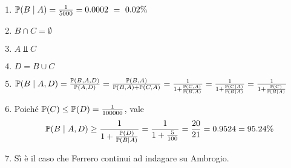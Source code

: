 \Soluzione

\Soluzione

\Soluzione

\Soluzione

\begin{enumerate}
	\item $\mathbb{P}( B\mid A) =\frac{1}{5000} =0.0002\ =\ 0.02\%$
	\item $B\cap C=\emptyset $
	\item $A\Bot C$
	\item $D=B\cup C$
	\item $\mathbb{P}( B\mid A,D) =\frac{\mathbb{P}( B,A,D)}{\mathbb{P}( A,D)} =\frac{\mathbb{P}( B,A)}{\mathbb{P}( B,A) +\mathbb{P}( C,A)} =\frac{1}{1+\frac{\mathbb{P}( C,A)}{\mathbb{P}( B,A)}} =\frac{1}{1+\frac{\mathbb{P}( C\mid A)}{\mathbb{P}( B\mid A)}} =\frac{1}{1+\frac{\mathbb{P}( C)}{\mathbb{P}( B\mid A)}}$
	\item Poiché $\mathbb{P}( C) \leq \mathbb{P}( D) =\frac{1}{100000}$, vale
	\begin{equation*}
		\mathbb{P}( B\mid A,D) \geq \frac{1}{1+\frac{\mathbb{P}( D)}{\mathbb{P}( B\mid A)}} =\frac{1}{1+\frac{5}{100}} =\frac{20}{21} =0.9524=95.24\%
	\end{equation*}
	\item Sì è il caso che Ferrero continui ad indagare su Ambrogio.
\end{enumerate}

\Soluzione

